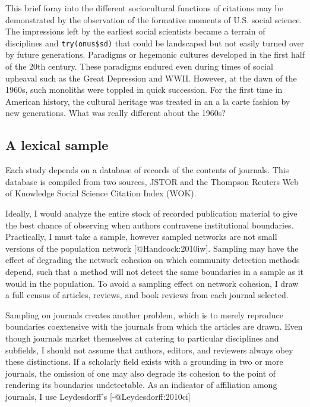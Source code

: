 \documentclass[]{article}
\begin{document}
This brief foray into the different sociocultural functions of citations
may be demonstrated by the observation of the formative moments of U.S.
social science. The impressions left by the earliest social scientists
became a terrain of disciplines and \texttt{try(onus\$sd)} that could be
landscaped but not easily turned over by future generations. Paradigms
or hegemonic cultures developed in the first half of the 20th century.
These paradigms endured even during times of social upheaval such as the
Great Depression and WWII. However, at the dawn of the 1960s, such
monoliths were toppled in quick succession. For the first time in
American history, the cultural heritage was treated in an a la carte
fashion by new generations. What was really different about the 1960s?

\subsection{A lexical sample}\label{a-lexical-sample}

Each study depends on a database of records of the contents of journals.
This database is compiled from two sources, JSTOR and the Thompson
Reuters Web of Knowledge Social Science Citation Index (WOK).

Ideally, I would analyze the entire stock of recorded publication
material to give the best chance of observing when authors contravene
institutional boundaries. Practically, I must take a sample, however
sampled networks are not small versions of the population network
{[}@Handcock:2010iw{]}. Sampling may have the effect of degrading the
network cohesion on which community detection methods depend, such that
a method will not detect the same boundaries in a sample as it would in
the population. To avoid a sampling effect on network cohesion, I draw a
full census of articles, reviews, and book reviews from each journal
selected.

Sampling on journals creates another problem, which is to merely
reproduce boundaries coextensive with the journals from which the
articles are drawn. Even though journals market themselves at catering
to particular disciplines and subfields, I should not assume that
authors, editors, and reviewers always obey these distinctions. If a
scholarly field exists with a grounding in two or more journals, the
omission of one may also degrade its cohesion to the point of rendering
its boundaries undetectable. As an indicator of affiliation among
journals, I use Leydesdorff's {[}-@Leydesdorff:2010ci{]}
\end{document}
